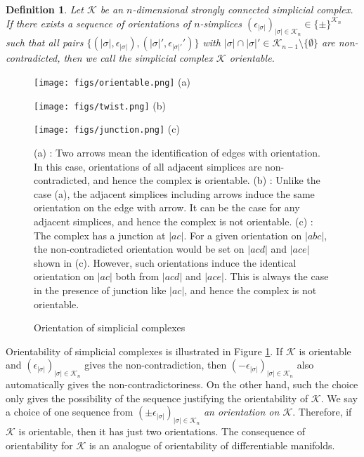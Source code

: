 \documentclass[a4paper,12pt]{article}
\newtheorem{definition}{Definition}[section]
\numberwithin{equation}{section}
\begin{document}
\begin{definition}\rm
Let $\mathcal{K}$ be an $n$-dimensional strongly connected simplicial complex. 
If there exists a sequence of orientations of $n$-simplices $(\epsilon_{|\sigma|})_{|\sigma|\in \mathcal{K}_n}\in \{\pm \}^{\mathcal{K}_n}$ such that all pairs
$\{ (|\sigma|,\epsilon_{|\sigma|}), (|\sigma|',\epsilon_{|\sigma|'}') \}$ with $|\sigma|\cap |\sigma|'\in \mathcal{K}_{n-1}\setminus \{\emptyset\}$ are non-contradicted, then we call the simplicial complex $\mathcal{K}$ {\em orientable}.
\end{definition}

\begin{figure}[htbp]\em
\begin{minipage}{0.32\hsize}
\centering
\texttt{[image: figs/orientable.png]}
(a)
\end{minipage}
\begin{minipage}{0.32\hsize}
\centering
\texttt{[image: figs/twist.png]}
(b)
\end{minipage}
\begin{minipage}{0.32\hsize}
\centering
\texttt{[image: figs/junction.png]}
(c)
\end{minipage}
\caption{Orientation of simplicial complexes}
\label{fig-orientation}
(a) : Two arrows mean the identification of edges with orientation. 
In this case, orientations of all adjacent simplices are non-contradicted, and hence the complex is orientable.
(b) : Unlike the case (a), the adjacent simplices including arrows induce the same orientation on the edge with arrow.
It can be the case for any adjacent simplices, and hence the complex is not orientable.
(c) : The complex has a junction at $|ac|$.
For a given orientation on $|abc|$, the non-contradicted orientation would be set on $|acd|$ and $|ace|$ shown in (c). 
However, such orientations induce the identical orientation on $|ac|$ both from $|acd|$ and $|ace|$.
This is always the case in the presence of junction like $|ac|$, and hence the complex is not orientable.
\end{figure}

Orientability of simplicial complexes is illustrated in Figure \ref{fig-orientation}.
If $\mathcal{K}$ is orientable and $(\epsilon_{|\sigma|})_{|\sigma|\in \mathcal{K}_n}$ gives the non-contradiction, then 
$(-\epsilon_{|\sigma|})_{|\sigma|\in \mathcal{K}_n}$ also automatically gives the non-contradictoriness.
On the other hand, such the choice only gives the possibility of the sequence justifying the orientability of $\mathcal{K}$.
We say a choice of one sequence from $(\pm\epsilon_{|\sigma|})_{|\sigma|\in \mathcal{K}_n}$ {\em an orientation on $\mathcal{K}$}.
Therefore, if $\mathcal{K}$ is orientable, then it has just two orientations.
The consequence of orientability for $\mathcal{K}$ is an analogue of orientability of differentiable manifolds.
\end{document}
